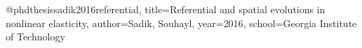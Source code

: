 @phdthesis{sadik2016referential,
  title={Referential and spatial evolutions in nonlinear elasticity},
  author={Sadik, Souhayl},
  year={2016},
  school={Georgia Institute of Technology}
}